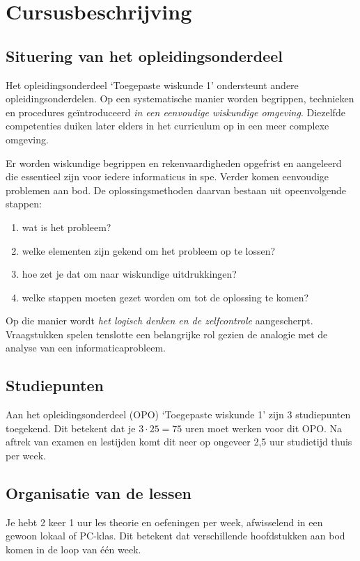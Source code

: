 \newpage
\section*{Cursusbeschrijving}
\subsection*{Situering van het opleidingsonderdeel}

Het opleidingsonderdeel `Toegepaste wiskunde 1' ondersteunt andere opleidingsonderdelen. Op een systematische manier worden begrippen, technieken en procedures ge\"{i}ntro\-du\-ceerd \emph{in een eenvoudige wiskundige omgeving}. Diezelfde competenties duiken later elders in het curriculum op in een meer complexe omgeving.
 
Er worden wiskundige begrippen en rekenvaardigheden opgefrist en aangeleerd die essentieel zijn voor iedere informaticus in spe. Verder komen eenvoudige problemen aan bod. De oplossingsmethoden daarvan bestaan uit opeenvolgende  stappen: 
\begin{enumerate}
\item wat is het probleem?
\item welke elementen zijn gekend om het probleem op te lossen?
\item hoe zet je dat om naar wiskundige uitdrukkingen?
\item welke stappen moeten gezet worden om tot de oplossing te komen?
\end{enumerate}

Op die manier wordt \emph{het logisch denken en de zelfcontrole} aangescherpt. Vraagstukken spelen tenslotte een belangrijke rol gezien de analogie met de analyse van een informaticaprobleem. 


\subsection*{Studiepunten}

Aan het opleidingsonderdeel (OPO) `Toegepaste wiskunde 1' zijn 3 studiepunten toegekend. Dit betekent dat je $3 \cdot 25=75$ uren moet werken voor dit OPO. Na aftrek van examen en lestijden komt dit neer op ongeveer 2,5 uur studietijd thuis per week.

\subsection*{Organisatie van de lessen}

Je hebt 2 keer 1 uur les theorie en oefeningen per week, afwisselend in een gewoon lokaal of PC-klas. Dit betekent dat verschillende hoofdstukken aan bod komen in de loop van \'{e}\'{e}n week. 

